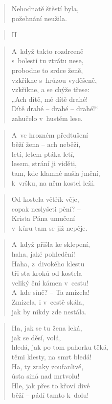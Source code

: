 \begin{verse}
Nehodnatě štěstí byla, \\
požehnání neužila.
\end{verse}

\begin{verse}
II
\end{verse}

\begin{verse}
A~když takto rozdrceně \\
s~bolestí tu ztrátu nese, \\
probodne to srdce ženě, \\
vzkřikne s~hrůzou vyděšeně, \\
vzkřikne, a se chýže třese: \\
„Ach dítě, mé dítě drahé! \\
Dítě drahé -- drahé -- drahé!“ \\
zahučelo v~hustém lese.
\end{verse}

\begin{verse}
A~ve hrozném předtušení \\
běží žena -- ach neběží, \\
letí, letem ptáka letí, \\
lesem, strání ji viděti, \\
tam, kde klamné našla jmění, \\
k~vršku, na něm kostel leží.
\end{verse}

\begin{verse}
Od kostela větřík věje, \\
copak neslyšeti pění? -- \\
Krista Pána umučení \\
v~kůru tam se již nepěje.
\end{verse}

\begin{verse}
A~když přišla ke sklepení, \\
haha, jaké pohledění! \\
Haha, z~divokého klestu \\
tři sta kroků od kostela \\
veliký ční kámen v~cestu! \\
A~kde síně? -- Ta zmizela! \\
Zmizela, i v~cestě skála, \\
jak by nikdy zde nestála.
\end{verse}

\begin{verse}
Ha, jak se tu žena leká, \\
jak se děsí, volá, \\
hledá, jak po tom pahorku těká, \\
těmi klesty, na smrt bledá! \\
Ha, ty zraky zoufanlivé, \\
ústa siná nad mrtvolu! \\
Hle, jak přes to křoví divé \\
běží -- pádí tamto k~dolu!
\end{verse}

